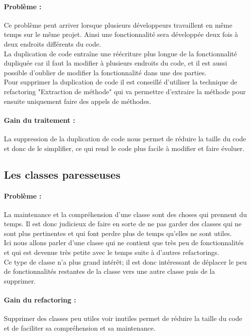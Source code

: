 \documentclass[a4paper,twoside,12pt,openright]{report}
\begin{document}
\paragraph{Problème :}
Ce problème peut arriver lorsque plusieurs développeurs travaillent en même temps sur le même projet. Ainsi une fonctionnalité sera développée deux fois à deux endroits différents du code.\\
La duplication de code entraîne une réécriture plus longue de la fonctionnalité dupliquée car il faut la modifier à plusieurs endroits du code, et il est aussi possible d'oublier de modifier la fonctionnalité dans une des parties.\\
Pour supprimer la duplication de code il est conseillé d'utiliser la technique de refactoring "Extraction de méthode" qui va permettre d'extraire la méthode pour ensuite uniquement faire des appels de méthodes.\\

\paragraph{Gain du traitement :}
La suppression de la duplication de code nous permet de réduire la taille du code et donc de le simplifier, ce qui rend le code plus facile à modifier et faire évoluer.\\

\subsection{Les classes paresseuses}
\paragraph{Problème :}
La maintenance et la compréhension d'une classe sont des choses qui prennent du temps. Il est donc judicieux de faire en sorte de ne pas garder des classes qui ne sont plus pertinentes et qui font perdre plus de temps qu'elles ne sont utiles.\\
Ici nous allons parler d'une classe qui ne contient que très peu de fonctionnalités et qui est devenue très petite avec le temps suite à d'autres refactorings.\\


Ce type de classe n'a plus grand intérêt; il est donc intéressant de déplacer le peu de fonctionnalités restantes de la classe vers une autre classe puis de la supprimer.\\

\paragraph{Gain du refactoring :}
Supprimer des classes peu utiles voir inutiles permet de réduire la taille du code et de faciliter sa compréhension et sa maintenance.\\
\end{document}
